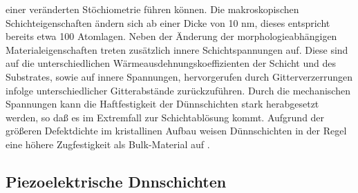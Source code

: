 einer veränderten Stöchiometrie führen können.  Die makroskopischen
Schichteigenschaften ändern sich ab einer Dicke von 10 nm,
dieses entspricht bereits etwa 100 Atomlagen. Neben der
Änderung der morphologieabhängigen Materialeigenschaften treten
zusätzlich innere Schichtspannungen auf.  Diese sind auf die
unterschiedlichen Wärmeausdehnungskoeffizienten der Schicht und des
Substrates, sowie auf innere Spannungen, hervorgerufen durch
Gitterverzerrungen infolge unterschiedlicher Gitterabstände
zurückzuführen. Durch die mechanischen Spannungen kann die
Haftfestigkeit der Dünnschichten stark herabgesetzt werden, so daß es im
Extremfall zur Schichtablösung kommt.  Aufgrund der größeren
Defektdichte im kristallinen Aufbau weisen Dünnschichten in der Regel
eine höhere Zugfestigkeit als Bulk-Material auf \cite{Gra91}.



\subsection{Piezoelektrische Dnnschichten}

